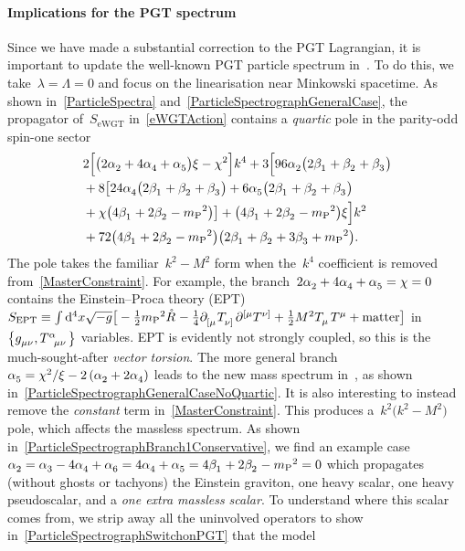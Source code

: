 \documentclass[aps,prd,reprint,preprintnumbers,showpacs,floatfix,nofootinbib,superscript address]{revtex4-2}
\begin{document}
\paragraph*{Implications for the PGT spectrum} Since we have made a substantial correction to the PGT Lagrangian, it is important to update the well-known PGT particle spectrum in~\cite{Hayashi:1980qp}. To do this, we take~$\lambda= \Lambda = 0$ and focus on the linearisation near Minkowski spacetime. As shown in~\cref{ParticleSpectra} and~\cref{ParticleSpectrographGeneralCase}, the propagator of~$S_{\text{eWGT}}$ in~\cref{eWGTAction} contains a \emph{quartic} pole in the parity-odd spin-one sector
\begin{align}
	\label{MasterConstraint}
	&2\Big[\big(2\Alp{2}+4\Alp{4}+\Alp{5}\big)\xi-\chi^2\Big]k^4
	+3\Big[
		96\Alp{2}\big(2\Bet{1}+\Bet{2}+\Bet{3}\big)
		\nonumber\\&
		+8\big[24\Alp{4}\big(2\Bet{1}+\Bet{2}+\Bet{3}\big)+6\Alp{5}\big(2\Bet{1}+\Bet{2}+\Bet{3}\big)
		\nonumber\\&
		+\chi\big(4\Bet{1}+2\Bet{2}-\MPl{}^2\big)\big]+\big(4\Bet{1}+2\Bet{2}-\MPl{}^2\big)\xi
	\Big]k^2
		\nonumber\\&
	+72\big(4\Bet{1}+2\Bet{2}-\MPl{}^2\big)\big(2\Bet{1}+\Bet{2}+3\Bet{3}+\MPl{}^2\big).
\end{align}
The pole takes the familiar~$k^2-M^2$ form when the~$k^4$ coefficient is removed from~\cref{MasterConstraint}. For example, the branch~$2\Alp{2}+4\Alp{4}+\Alp{5}=\chi=0$ contains the Einstein--Proca theory (EPT)~$S_{\text{EPT}}\equiv\int\mathrm{d}^4x\sqrt{-g}\big[-\frac{1}{2}\MPl{}^2\rR{}-\frac{1}{4}\PD{_{[\mu}}\MAGT{_{\nu]}}\PD{^{[\mu}}\MAGT{^{\nu]}}+\frac{1}{2}M^2\MAGT{_\mu}\MAGT{^\mu}+\text{matter}\big]$ in~$\big\{\FieldG{_{\mu\nu}},\MAGT{^\alpha_{\mu}_{\nu}}\big\}$ variables. EPT is evidently not strongly coupled, so this is the much-sought-after \emph{vector torsion}. The more general branch~$\Alp{5}=\chi^2/\xi-2\left(\Alp{2}+2\Alp{4}\right)$ leads to the new mass spectrum in~, as shown in~\cref{ParticleSpectrographGeneralCaseNoQuartic}. It is also interesting to instead remove the \emph{constant} term in~\cref{MasterConstraint}. This produces a~$k^2\big(k^2-M^2\big)$ pole, which affects the massless spectrum. As shown in~\cref{ParticleSpectrographBranch1Conservative}, we find an example case~$\Alp{2}=\Alp{3}-4\Alp{4}+\Alp{6}=4\Alp{4}+\Alp{5}=4\Bet{1}+2\Bet{2}-\MPl{}^2=0$ which propagates (without ghosts or tachyons) the Einstein graviton, one heavy scalar, one heavy pseudoscalar, and a \emph{one extra massless scalar}. To understand where this scalar comes from, we strip away all the uninvolved operators to show in~\cref{ParticleSpectrographSwitchonPGT} that the model 
\end{document}
